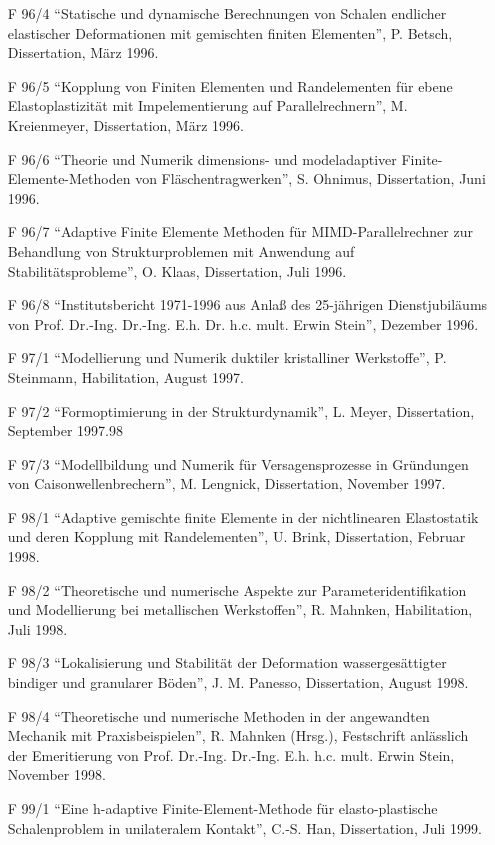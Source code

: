 \begin{itemize}
    \item[F 96/4] ``Statische und dynamische Berechnungen von Schalen endlicher elastischer Deformationen mit gemischten finiten Elementen”, P. Betsch, Dissertation, März 1996.
    \item[F 96/5] ``Kopplung von Finiten Elementen und Randelementen für ebene Elastoplastizität mit Impelementierung auf Parallelrechnern”, M. Kreienmeyer, Dissertation, März 1996.
    \item[F 96/6] ``Theorie und Numerik dimensions- und modeladaptiver Finite- Elemente-Methoden von Fläschentragwerken”, S. Ohnimus, Dissertation, Juni 1996.
    \item[F 96/7] ``Adaptive Finite Elemente Methoden für MIMD-Parallelrechner zur Behandlung von Strukturproblemen mit Anwendung auf Stabilitätsprobleme”, O. Klaas, Dissertation, Juli 1996.
    \item[F 96/8] ``Institutsbericht 1971-1996 aus Anlaß des 25-jährigen Dienstjubiläums von Prof. Dr.-Ing. Dr.-Ing. E.h. Dr. h.c. mult. Erwin Stein”, Dezember 1996.
    \item[F 97/1] ``Modellierung und Numerik duktiler kristalliner Werkstoffe”, P. Steinmann, Habilitation, August 1997.
    \item[F 97/2] ``Formoptimierung in der Strukturdynamik”, L. Meyer, Dissertation, September 1997.98
    \item[F 97/3] ``Modellbildung und Numerik für Versagensprozesse in Gründungen von Caisonwellenbrechern”, M. Lengnick, Dissertation, November 1997.
    \item[F 98/1] ``Adaptive gemischte finite Elemente in der nichtlinearen Elastostatik und deren Kopplung mit Randelementen”, U. Brink, Dissertation, Februar 1998.
    \item[F 98/2] ``Theoretische und numerische Aspekte zur Parameteridentifikation und Modellierung bei metallischen Werkstoffen”, R. Mahnken, Habilitation, Juli 1998.
    \item[F 98/3] ``Lokalisierung und Stabilität der Deformation wassergesättigter bindiger und granularer Böden”, J. M. Panesso, Dissertation, August 1998.
    \item[F 98/4] ``Theoretische und numerische Methoden in der angewandten Mechanik mit Praxisbeispielen”, R. Mahnken (Hrsg.), Festschrift anlässlich der Emeritierung von Prof. Dr.-Ing. Dr.-Ing. E.h. h.c. mult. Erwin Stein, November 1998.
    \item[F 99/1] ``Eine h-adaptive Finite-Element-Methode für elasto-plastische Schalenproblem in unilateralem Kontakt”, C.-S. Han, Dissertation, Juli 1999.

\end{itemize}
